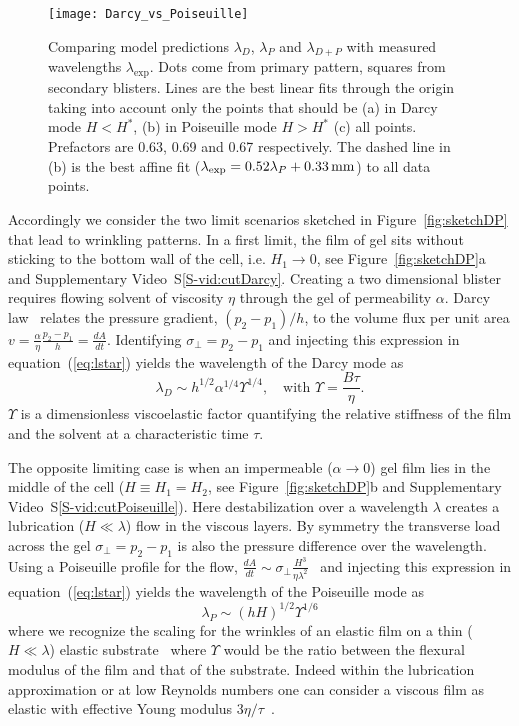 \documentclass[twocolumn,superscriptaddress,showpacs,preprintnumbers, amsmath,amssymb,prl]{revtex4-1}
\begin{document}
\begin{figure*}
	\texttt{[image: Darcy\_vs\_Poiseuille]}
	\caption{Comparing model predictions $\lambda_D$, $\lambda_P$ and $\lambda_{D+P}$ with measured wavelengths $\lambda_\text{exp}$. Dots come from primary pattern, squares from secondary blisters. Lines are the best linear fits through the origin taking into account only the points that should be (a) in Darcy mode $H<H^*$, (b) in Poiseuille mode $H>H^*$ (c) all points. Prefactors are 0.63, 0.69 and 0.67 respectively. The dashed line in (b) is the best affine fit ($\lambda_{\rm exp}=0.52\lambda_{P}+\SI{0.33}{\milli\metre}$) to all data points.}
	\label{fig:DarcyPoiseuille}
\end{figure*}

Accordingly we consider the two limit scenarios sketched in Figure~\ref{fig:sketchDP} that lead to wrinkling patterns. In a first limit, the film of gel sits without sticking to the bottom wall of the cell, i.e. $H_1\rightarrow0$, see Figure~\ref{fig:sketchDP}a and Supplementary Video~S\ref{S-vid:cutDarcy}. Creating a two dimensional blister requires flowing solvent of viscosity $\eta$ through the gel of permeability $\alpha$. Darcy law~\cite{Darcy1856} relates the pressure gradient, $(p_2-p_1)/h$, to the volume flux per unit area $v = \frac{\alpha}{\eta}\frac{p_2-p_1}{h} = \frac{dA}{dt}$. Identifying $\sigma_{\perp}=p_2-p_1$ and injecting this expression in equation~(\ref{eq:lstar}) yields the wavelength of the Darcy mode as
\begin{equation}
\lambda_D \sim h^{1/2} \alpha^{1/4} \Upsilon^{1/4},\quad\text{with } \Upsilon = \frac{B\tau}{\eta}.
\end{equation}
$\Upsilon$ is a dimensionless viscoelastic factor quantifying the relative stiffness of the film and the solvent at a characteristic time $\tau$. 

The opposite limiting case is when an impermeable ($\alpha\rightarrow 0$) gel film lies in the middle of the cell ($H\equiv H_1=H_2$, see Figure~\ref{fig:sketchDP}b and Supplementary Video~S\ref{S-vid:cutPoiseuille}). Here destabilization over a wavelength $\lambda$ creates a lubrication ($H\ll\lambda$) flow in the viscous layers. By symmetry the transverse load across the gel $\sigma_{\perp}=p_2-p_1$ is also the pressure difference over the wavelength. Using a Poiseuille profile for the flow, $\frac{dA}{dt} \sim \sigma_{\perp} \frac{H^3}{\eta\lambda^2}$~\cite{Poiseuille1842} and injecting this expression in equation~(\ref{eq:lstar}) yields the wavelength of the Poiseuille mode as
\begin{equation}
\lambda_P \sim (hH)^{1/2} \Upsilon^{1/6}
\end{equation}
where we recognize the scaling for the wrinkles of an elastic film on a thin ($H\ll\lambda$) elastic substrate~\cite{Cerda2003} where $\Upsilon$ would be the ratio between the flexural modulus of the film and that of the substrate. Indeed within the lubrication approximation or at low Reynolds numbers one can consider a viscous film as elastic with effective Young modulus $3\eta/\tau$~\cite{Biot1957,Boudaoud2001}.
\end{document}
